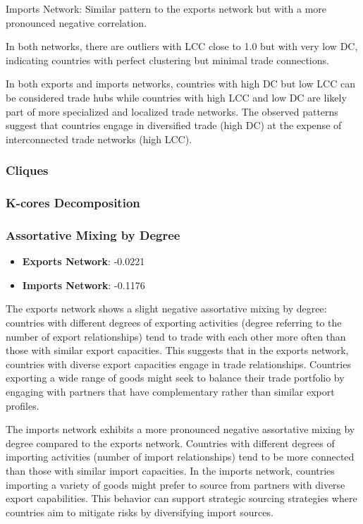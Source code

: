 \documentclass[12pt, a4paper]{article}
\begin{document}
Imports Network: Similar pattern to the exports network but with a more pronounced negative correlation.

In both networks, there are outliers with LCC close to 1.0 but with very low DC, indicating countries with perfect clustering but minimal trade connections.

In both exports and imports networks, countries with high DC but low LCC can be considered trade hubs while countries with high LCC and low DC are likely part of more specialized and localized trade networks. The observed patterns suggest that countries engage in diversified trade (high DC) at the expense of interconnected trade networks (high LCC).
\subsubsection{Cliques}
\subsubsection{K-cores Decomposition}
\subsubsection{Assortative Mixing by Degree}
\begin{itemize}
\item \textbf{Exports Network}: -0.0221
\item \textbf{Imports Network}: -0.1176
\end{itemize}
The exports network shows a slight negative assortative mixing by degree: countries with different degrees of exporting activities (degree referring to the number of export relationships) tend to trade with each other more often than those with similar export capacities. This suggests that in the exports network, countries with diverse export capacities engage in trade relationships. Countries exporting a wide range of goods might seek to balance their trade portfolio by engaging with partners that have complementary rather than similar export profiles.

The imports network exhibits a more pronounced negative assortative mixing by degree compared to the exports network. Countries with different degrees of importing activities (number of import relationships) tend to be more connected than those with similar import capacities. In the imports network, countries importing a variety of goods might prefer to source from partners with diverse export capabilities. This behavior can support strategic sourcing strategies where countries aim to mitigate risks by diversifying import sources.
\end{document}
